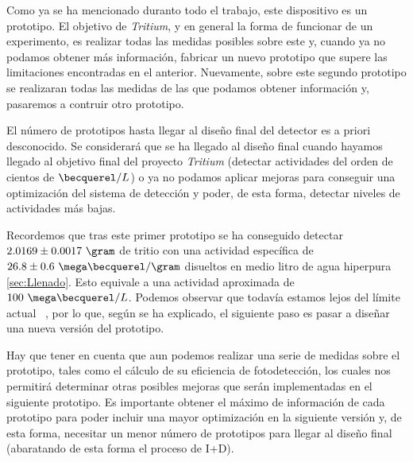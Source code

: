 Como ya se ha mencionado duranto todo el trabajo, este dispositivo es un prototipo. El objetivo de \textit{Tritium}, y en general la forma de funcionar de un experimento, es realizar todas las medidas posibles sobre este y, cuando ya no podamos obtener más información, fabricar un nuevo prototipo que supere las limitaciones encontradas en el anterior. Nuevamente, sobre este segundo prototipo se realizaran todas las medidas de las que podamos obtener información y, pasaremos a contruir otro prototipo.

El número de prototipos hasta llegar al diseño final del detector es a priori desconocido. Se considerará que se ha llegado al diseño final cuando hayamos llegado al objetivo final del proyecto \textit{Tritium} (detectar actividades del orden de cientos de $\becquerel/L$) o ya no podamos aplicar mejoras para conseguir una optimización del sistema de detección y poder, de esta forma, detectar niveles de actividades más bajas.

Recordemos que tras este primer prototipo se ha conseguido detectar $2.0169 \pm 0.0017~\gram$ de tritio con una actividad específica de $26.8 \pm 0.6~\mega\becquerel/\gram$ disueltos en medio litro de agua hiperpura \ref{sec:Llenado}. Esto equivale a una actividad aproximada de $100~\mega\becquerel/L$. Podemos observar que todavía estamos lejos del límite actual ~\cite{Rat}, por lo que, según se ha explicado, el siguiente paso es pasar a diseñar una nueva versión del prototipo. 

Hay que tener en cuenta que aun podemos realizar una serie de medidas sobre el prototipo, tales como el cálculo de su eficiencia de fotodetección, los cuales nos permitirá determinar otras posibles mejoras que serán implementadas en el siguiente prototipo. Es importante obtener el máximo de información de cada prototipo para poder incluir una mayor optimización en la siguiente versión y, de esta forma, necesitar un menor número de prototipos para llegar al diseño final (abaratando de esta forma el proceso de I+D). 

